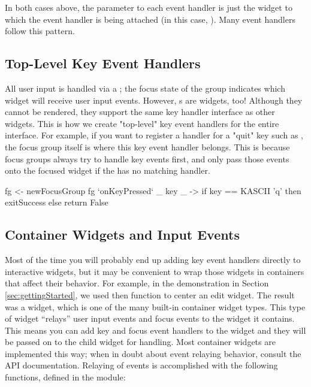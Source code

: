 In both cases above, the  parameter to each event handler is
just the widget to which the event handler is being attached (in this
case, ).  Many event handlers follow this pattern.

\subsection{Top-Level Key Event Handlers}

All user input is handled via a ; the focus state of
the group indicates which widget will receive user input events.
However, s are widgets, too!  Although they cannot be
rendered, they support the same key handler interface as other
widgets.  This is how we create "top-level" key event handlers for the
entire interface.  For example, if you want to register a handler for
a "quit" key such as , the focus group itself is where this
key event handler belongs.  This is because focus groups always try to
handle key events first, and only pass those events onto the focused
widget if the  has no matching handler.

\begin{haskellcode}
 fg <- newFocusGroup
 fg `onKeyPressed` \_ key _ ->
   if key == KASCII 'q' then
     exitSuccess else return False
\end{haskellcode}

\subsection{Container Widgets and Input Events}
\label{sec:containers_and_input}

Most of the time you will probably end up adding key event handlers
directly to interactive widgets, but it may be convenient to wrap
those widgets in containers that affect their behavior.  For example,
in the demonstration in Section \ref{sec:gettingStarted}, we used then
 function to center an edit widget.  The result was a
 widget, which is one of the many built-in container
widget types.  This type of widget ``relays'' user input events and
focus events to the widget it contains.  This means you can add key
and focus event handlers to the  widget and they will be
passed on to the child widget for handling.  Most container widgets
are implemented this way; when in doubt about event relaying behavior,
consult the API documentation.  Relaying of events is accomplished
with the following functions, defined in the  module:

